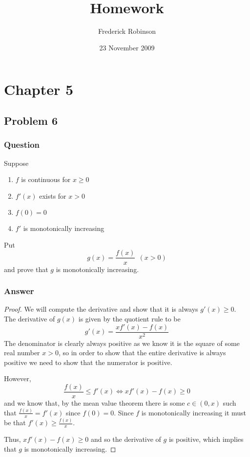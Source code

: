 \documentclass[12pt]{article}
\title{Homework}
\author{Frederick Robinson}
\date{23 November 2009}
\begin{document}

   \maketitle

\setcounter{tocdepth}{2} 


\section{Chapter 5}
\subsection{Problem 6}

\subsubsection{Question}

Suppose
\begin{enumerate}
\item $f$ is continuous for $x\geq 0$
\item $f'(x)$ exists for $x>0$
\item $f(0)=0$
\item $f'$ is monotonically increasing
\end{enumerate}
Put
\[g(x)=\frac{f(x)}{x} \ \ (x>0)\]
and prove that $g$ is monotonically increasing.


\subsubsection{Answer}
\begin{proof}
We will compute the derivative and show that it is always $g'(x) \geq 0$. The derivative of $g(x)$ is given by the quotient rule to be
\[g'(x)=\frac{xf'(x)-f(x)}{x^2}\]
The denominator is clearly always positive as we know it is the square of some real number $x>0$, so in order to show that the entire derivative is always positive we need to show that the numerator is positive.

However, 
\[\frac{f(x)}{x}\leq f'(x) \Leftrightarrow xf'(x)-f(x) \geq 0 \]
and we know that, by the mean value theorem there is some $c \in (0,x)$ such that $\frac{f(x)}{x}=f'(x)$ since $f(0)=0$. Since $f$ is monotonically increasing it must be that $f'(x) \geq \frac{f(x)}{x}$.

Thus, $xf'(x)-f(x) \geq 0 $ and so the derivative of $g$ is positive, which implies that $g$ is monotonically increasing.

\end{proof}
\end{document}
